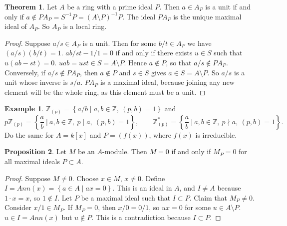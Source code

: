 \documentclass{article}
\newcommand{\Z}{\mathbb{Z}}
\newcommand{\rb}[1]{\left( #1 \right)}
\renewcommand{\sb}[1]{\left[ #1 \right]}
\newcommand{\cb}[1]{\left\{ #1 \right\}}
\theoremstyle{definition}\newtheorem{definition}{Definition}[section]
\theoremstyle{definition}\newtheorem{remark}[definition]{Remark}
\theoremstyle{definition}\newtheorem*{example}{Example}
\theoremstyle{definition}\newtheorem*{note}{Note}
\newtheorem{proposition}[definition]{Proposition}
\newtheorem{theorem}[definition]{Theorem}
\begin{document}
\begin{theorem}
Let $ A $ be a ring with a prime ideal $ P $. Then $ a \in A_P $ is a unit if and only if $ a \notin PA_P = S^{-1}P = \rb{A \setminus P}^{-1}P $. The ideal $ PA_P $ is the unique maximal ideal of $ A_P $. So $ A_P $ is a local ring.
\end{theorem}

\begin{proof}
Suppose $ a / s \in A_P $ is a unit. Then for some $ b / t \in A_P $ we have $ \rb{a / s}\rb{b / t} = 1 $. $ ab / st - 1 / 1 = 0 $ if and only if there exists $ u \in S $ such that $ u\rb{ab - st} = 0 $. $ uab = ust \in S = A \setminus P $. Hence $ a \notin P $, so that $ a / s \notin PA_P $. Conversely, if $ a / s \notin PA_P $, then $ a \notin P $ and $ s \in S $ gives $ a \in S = A \setminus P $. So $ a / s $ is a unit whose inverse is $ s / a $. $ PA_P $ is a maximal ideal, because joining any new element will be the whole ring, as this element must be a unit.
\end{proof}

\begin{example}
$ \Z_{\rb{p}} = \cb{a / b \mid a, b \in \Z, \ \rb{p, b} = 1} $ and
$$ p\Z_{\rb{p}} = \cb{\dfrac{a}{b} \ \Big| \ a, b \in \Z, \ p \mid a, \ \rb{p, b} = 1}, \qquad \Z_{\rb{p}}^* = \cb{\dfrac{a}{b} \ \Big| \ a, b \in \Z, \ p \nmid a, \ \rb{p, b} = 1}. $$
Do the same for $ A = k\sb{x} $ and $ P = \rb{f\rb{x}} $, where $ f\rb{x} $ is irreducible.
\end{example}

\begin{proposition}
Let $ M $ be an $ A $-module. Then $ M = 0 $ if and only if $ M_P = 0 $ for all maximal ideals $ P \subset A $.
\end{proposition}

\begin{proof}
Suppose $ M \ne 0 $. Choose $ x \in M $, $ x \ne 0 $. Define $ I = Ann\rb{x} = \cb{a \in A \mid ax = 0} $. This is an ideal in $ A $, and $ I \ne A $ because $ 1 \cdot x = x $, so $ 1 \notin I $. Let $ P $ be a maximal ideal such that $ I \subset P $. Claim that $ M_P \ne 0 $. Consider $ x / 1 \in M_P $. If $ M_P = 0 $, then $ x / 0 = 0 / 1 $, so $ ux = 0 $ for some $ u \in A \setminus P $. $ u \in I = Ann\rb{x} $ but $ u \notin P $. This is a contradiction because $ I \subset P $.
\end{proof}

\end{document}

